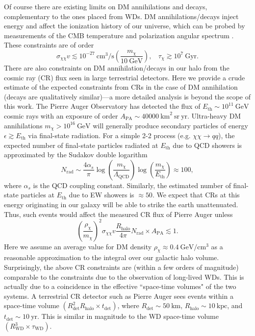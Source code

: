 \documentclass[preprintnumbers,amsmath,amssymb,prd,superscriptaddress]{revtex4}
\newcommand{\GeV}{\text{GeV}}
\newcommand{\cm}{\text{cm}}
\def\r{\right)}
\def\l{\left(}
\begin{document}
Of course there are existing limits on DM annihilations and decays, complementary to the ones placed from WDs. 
DM annihilations/decays inject energy and affect the ionization history of our universe, which can be probed by measurements of the CMB temperature and polarization angular spectrum \cite{Padmanabhan:2005es, Slatyer:2009yq, Slatyer:2016qyl}.
These constraints are of order
\begin{equation}
\label{eq:CMB}
\sigma_{\chi \chi} v \lesssim 10^{-27} ~\cm^3/\text{s} \l \frac{m_\chi}{10 ~\GeV} \r, ~~~~ \tau_\chi \gtrsim 10^{7} ~\text{Gyr}.
\end{equation}
There are also constraints on DM annihilation/decays in our halo from the cosmic ray (CR) flux seen in large terrestrial detectors.
Here we provide a crude estimate of the expected constraints from CRs in the case of DM annihilation (decays are qualitatively similar)---a more detailed analysis is beyond the scope of this work.
The Pierre Auger Observatory \cite{ThePierreAuger:2015rma} has detected the flux of $E_\text{th} \sim 10^{11} ~\GeV$ cosmic rays with an exposure of order $A_\text{PA} \sim 40000 ~\text{km}^2 ~\text{sr} ~\text{yr}$.
Ultra-heavy DM annihilations $m_\chi > 10^{16} ~\GeV$ will generally produce secondary particles of energy $\epsilon \gtrsim E_\text{th}$ via final-state radiation.
For a simple 2-2 process (e.g. $\chi \chi \to q q$), the expected number of final-state particles radiated at $E_\text{th}$ due to QCD showers is approximated by the Sudakov double logarithm
\begin{equation}
N_\text{rad} \sim \frac{4 \alpha_s}{\pi} \log\l\frac{m_\chi}{\Lambda_\text{QCD}}\r \log\l\frac{m_\chi}{E_\text{th}}\r \approx 100,
\end{equation}
where $\alpha_s$ is the QCD coupling constant.
Similarly, the estimated number of final-state particles at $E_\text{th}$ due to EW showers is $\approx 50$.
We expect that CRs at this energy originating in our galaxy will be able to strike the earth unattenuated.
Thus, such events would affect the measured CR flux of Pierre Auger unless
\begin{equation}
\l \frac{\rho_\chi}{m_\chi}\r^2 \sigma_{\chi \chi} v \frac{R_\text{halo}}{4 \pi} N_\text{rad} \times A_\text{PA} \lesssim 1.
\end{equation}
Here we assume an average value for DM density $\rho_\chi \approx 0.4~\GeV/\cm^3$ as a reasonable approximation to the integral over our galactic halo volume. 
Surprisingly, the above CR constraints are (within a few orders of magnitude) comparable to the constraints due to the observation of long-lived WDs.
This is actually due to a coincidence in the effective ``space-time volumes" of the two systems.
A terrestrial CR detector such as Pierre Auger sees events within a space-time volume $(R_\text{det}^2 R_\text{halo} \times t_\text{det})$, where $R_\text{det} \sim 50 ~\text{km}$, $R_\text{halo} \sim 10 ~\text{kpc}$, and $t_\text{det} \sim 10 ~\text{yr}$.
This is similar in magnitude to the WD space-time volume $(R_\text{WD}^3 \times \tau_\text{WD})$.
\end{document}
